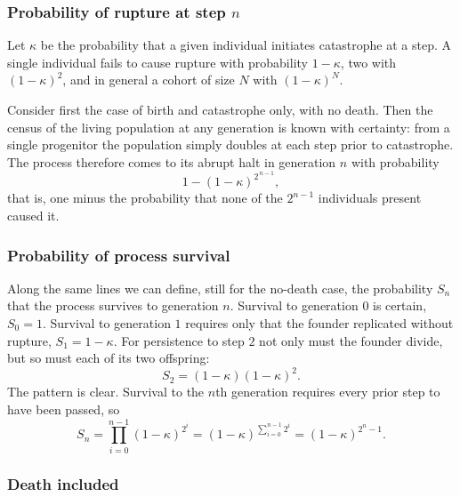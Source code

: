 \subsubsection*{Probability of rupture at step \texorpdfstring{$n$}{n}}

Let $\kappa$ be the probability that a given individual initiates catastrophe at a
step. A single individual fails to cause rupture with probability $1-\kappa$, two with
$(1-\kappa)^2$, and in general a cohort of size $N$ with $(1-\kappa)^N$.

Consider first the case of birth and catastrophe only, with no death. Then the census
of the living population at any generation is known with certainty: from a single
progenitor the population simply doubles at each step prior to catastrophe. The process
therefore comes to its abrupt halt in generation $n$ with probability
\begin{equation*}
1-(1-\kappa)^{2^{\,n-1}},
\end{equation*}
that is, one minus the probability that none of the $2^{n-1}$ individuals present caused
it.

\subsubsection*{Probability of process survival}

Along the same lines we can define, still for the no-death case, the probability $S_n$
that the process survives to generation $n$. Survival to generation $0$ is certain,
$S_0=1$. Survival to generation $1$ requires only that the founder replicated without
rupture, $S_1 = 1-\kappa$. For persistence to step $2$ not only must the founder divide,
but so must each of its two offspring:
\begin{equation*}
S_2 = (1-\kappa)(1-\kappa)^2 .
\end{equation*}
The pattern is clear. Survival to the $n$th generation requires every prior step to have
been passed, so
\begin{equation}
\label{eq:bdcS}
S_n = \prod_{i=0}^{n-1}(1-\kappa)^{2^i} = (1-\kappa)^{\sum_{i=0}^{n-1}2^i} = (1-\kappa)^{2^n-1}.
\end{equation}

\subsubsection*{Death included}


